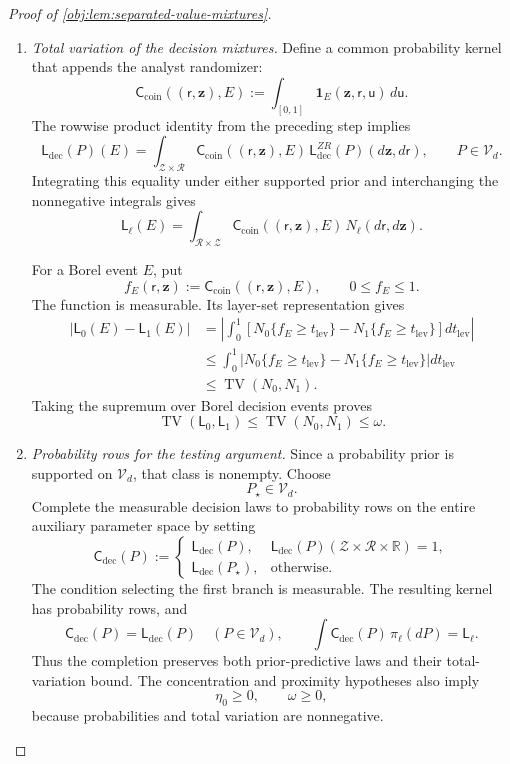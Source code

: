 \documentclass[11pt]{article}
\begin{document}
\begin{proof}[Proof of \cref{obj:lem:separated-value-mixtures}]
\begin{enumerate}
\item \textit{Total variation of the decision mixtures.}
Define a common probability kernel that appends the analyst randomizer:
\[
\mathsf C_{\mathrm{coin}}((\mathsf r,\mathbf z),E)
:=
\int_{[0,1]}
\mathbf1_E(\mathbf z,\mathsf r,\mathsf u)\,d\mathsf u.
\]
The rowwise product identity from the preceding step implies
\[
\mathsf L_{\mathrm{dec}}(P)(E)
=
\int_{\mathcal Z\times\mathcal R}
\mathsf C_{\mathrm{coin}}((\mathsf r,\mathbf z),E)\,
\mathsf L_{\mathrm{dec}}^{ZR}(P)(d\mathbf z,d\mathsf r),
\qquad P\in\mathcal V_d.
\]
Integrating this equality under either supported prior and interchanging the nonnegative integrals gives
\[
\mathsf L_\ell(E)
=
\int_{\mathcal R\times\mathcal Z}
\mathsf C_{\mathrm{coin}}((\mathsf r,\mathbf z),E)\,
N_\ell(d\mathsf r,d\mathbf z).
\]

For a Borel event \(E\), put
\[
f_E(\mathsf r,\mathbf z)
:=
\mathsf C_{\mathrm{coin}}((\mathsf r,\mathbf z),E),
\qquad
0\le f_E\le1.
\]
The function is measurable. Its layer-set representation gives
\[
\begin{aligned}
|\mathsf L_0(E)-\mathsf L_1(E)|
&=
\left|
\int_0^1
\left[
N_0\{f_E\ge t_{\mathrm{lev}}\}
-
N_1\{f_E\ge t_{\mathrm{lev}}\}
\right]dt_{\mathrm{lev}}
\right|\\
&\le
\int_0^1
\left|
N_0\{f_E\ge t_{\mathrm{lev}}\}
-
N_1\{f_E\ge t_{\mathrm{lev}}\}
\right|dt_{\mathrm{lev}}\\
&\le \operatorname{TV}(N_0,N_1).
\end{aligned}
\]
Taking the supremum over Borel decision events proves
\[
\operatorname{TV}(\mathsf L_0,\mathsf L_1)
\le \operatorname{TV}(N_0,N_1)
\le\omega.
\]

\item \textit{Probability rows for the testing argument.}
Since a probability prior is supported on \(\mathcal V_d\), that class is nonempty. Choose
\[
P_\star\in\mathcal V_d.
\]
Complete the measurable decision laws to probability rows on the entire auxiliary parameter space by setting
\[
\mathsf C_{\mathrm{dec}}(P):=
\begin{cases}
\mathsf L_{\mathrm{dec}}(P),
&\mathsf L_{\mathrm{dec}}(P)
(\mathcal Z\times\mathcal R\times\mathbb R)=1,\\
\mathsf L_{\mathrm{dec}}(P_\star),
&\text{otherwise}.
\end{cases}
\]
The condition selecting the first branch is measurable. The resulting kernel has probability rows, and
\[
\mathsf C_{\mathrm{dec}}(P)
=\mathsf L_{\mathrm{dec}}(P)
\quad(P\in\mathcal V_d),
\qquad
\int\mathsf C_{\mathrm{dec}}(P)\,\pi_\ell(dP)
=\mathsf L_\ell.
\]
Thus the completion preserves both prior-predictive laws and their total-variation bound. The concentration and proximity hypotheses also imply
\[
\eta_0\ge0,
\qquad
\omega\ge0,
\]
because probabilities and total variation are nonnegative.


\end{enumerate}
\end{proof}
\end{document}
